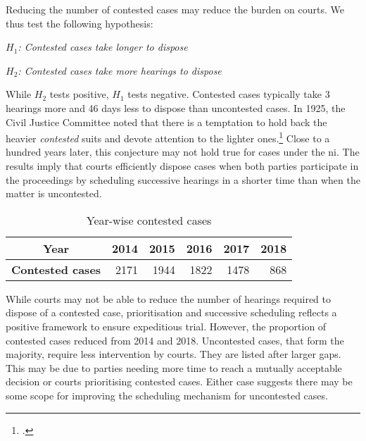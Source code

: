 Reducing the number of contested cases may reduce the burden on courts. We thus test the following hypothesis:

\begin{center}
 \textit{\(H_1\): Contested cases take longer to dispose}

 \textit{\(H_2\): Contested cases take more hearings to dispose}
\end{center}

While \(H_2\) tests positive, \(H_1\) tests negative. Contested cases typically take 3 hearings more and 46 days less to dispose than uncontested cases. In 1925, the Civil Justice Committee noted that there is a temptation to hold back the heavier \textit{contested} suits and devote attention to the lighter ones.\footcite{cg1925_civiljustice} Close to a hundred years later, this conjecture may not hold true for cases under the \gls{ni}. The results imply that courts efficiently dispose cases when both parties participate in the proceedings by scheduling successive hearings in a shorter time than when the matter is uncontested.

\begin{longtable}{@{}c|ccccc@{}}
\caption{Year-wise contested cases}
\label{tab:year_contest}\\
\toprule
\textbf{Year} & \textbf{2014} & \textbf{2015} & \textbf{2016} & \textbf{2017} & \textbf{2018} \\ \midrule
\textbf{Contested cases} & \multicolumn{1}{r}{2171} & \multicolumn{1}{r}{1944} & \multicolumn{1}{r}{1822} & \multicolumn{1}{r}{1478} & \multicolumn{1}{r}{868} \\ \bottomrule
\end{longtable}

While courts may not be able to reduce the number of hearings required to dispose of a contested case, prioritisation and successive scheduling reflects a positive framework to ensure expeditious trial. However, the proportion of contested cases reduced from 2014 and 2018. Uncontested cases, that form the majority, require less intervention by courts. They are listed after larger gaps. This may be due to parties needing more time to reach a mutually acceptable decision or courts prioritising contested cases. Either case suggests there may be some scope for improving the scheduling mechanism for uncontested cases.



